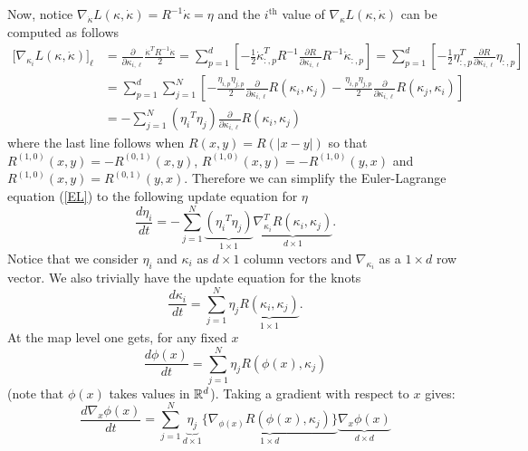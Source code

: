 \documentclass[noinfoline]{imsart}
\begin{document}
{Now, notice  $ \nabla_{\dot\kappa} L(\kappa,\dot \kappa) = R^{-1}\dot \kappa = \eta$ and the $i^\text{th}$ value of $\nabla_{\kappa} L(\kappa,\dot \kappa) $ can be computed as follows
\begin{align*}
\bigl[\nabla_{\kappa_i} L(\kappa,\dot \kappa)]_{\ell} & = \frac{\partial}{ \partial \kappa_{i,\ell}} \frac{ \dot\kappa^T R^{-1} \dot\kappa}{2}  = \sum_{p=1}^d \left[-\frac{1}{2} \dot\kappa^T_{:,p} R^{-1} \frac{\partial R}{\partial \kappa_{i,\ell}}  R^{-1} \dot\kappa_{:,p} \right] = \sum_{p=1}^d  \left[-\frac{1}{2} \eta_{:,p}^T \frac{\partial R}{\partial \kappa_{i,\ell}}  \eta_{:,p} \right]\\
&= \sum_{p=1}^d \sum_{j=1}^N \left[-\frac{\eta_{i,p} \eta_{j,p}}{2} \frac{\partial }{\partial \kappa_{i,\ell}}R(\kappa_i,\kappa_j)  -\frac{\eta_{i,p} \eta_{j,p }}{2}  \frac{\partial }{\partial \kappa_{i,\ell}}R(\kappa_j,\kappa_i)   \right]\\
&= -\sum_{j=1}^N ({\eta_i}^T \eta_j) \frac{\partial }{\partial \kappa_{i,\ell}}R(\kappa_i,\kappa_j) 
\end{align*}
where the last line follows when $R(x,y) = R(|x-y|)$ so that $R^{(1,0)}(x,y)= - R^{(0,1)}(x,y)$, $R^{(1,0)}(x,y)= - R^{(1,0)}(y,x)$ and $R^{(1,0)}(x,y)=  R^{(0,1)}(y,x)$.
Therefore we can simplify the Euler-Lagrange equation (\ref{EL}) to the following update equation for $\eta$
\begin{equation}
\label{updateEta} 
\frac{d\eta_i}{dt} = - \sum_{j=1}^N \underbrace{({\eta_i}^T\eta_j)}_{1\times 1}\underbrace{ \nabla^T_{\kappa_i}R(\kappa_i,\kappa_j)}_{d\times 1}. \end{equation}
Notice that we consider $\eta_i$ and $\kappa_i$ as $d\times 1$ column vectors and $\nabla_{\kappa_i}$ as a $1\times d$ row vector.
We also trivially have the update equation for the knots
\begin{equation}
\label{updateKnots}
\frac{d\kappa_i}{dt}=\sum_{j=1}^N \eta_j \underbrace{R(\kappa_i,\kappa_j)}_{1\times 1} .
\end{equation}
At the map level one gets, for any fixed $x$
\begin{equation}
\frac{d\phi(x)}{dt} = \sum_{j=1}^N \eta_j R(\phi(x),\kappa_j)
\end{equation}
 (note that $\phi(x)$ takes values in $\Bbb R^d$).
Taking a gradient with respect to $x$ gives:
\begin{equation}
\frac{d\nabla_x\phi(x)}{dt} = \sum_{j=1}^N \underbrace{\eta_j}_{d\times 1} \underbrace{\{ \nabla_{\phi(x)}R(\phi(x),\kappa_j)\}}_{1\times d} \underbrace{ \nabla_x {\phi(x)}}_{d\times d}
\end{equation}


}
\end{document}
